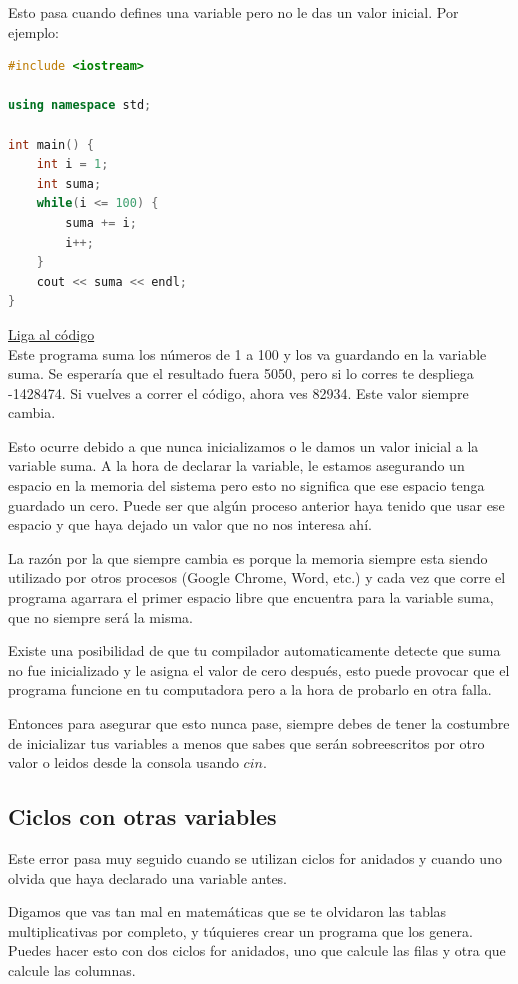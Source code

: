 \documentclass{article}
\begin{document}
Esto pasa cuando defines una variable pero no le das un valor inicial. Por ejemplo:

\begin{lstlisting}[language=C++, caption=Error de inicialización]
#include <iostream>

using namespace std;

int main() {
    int i = 1;
    int suma;
    while(i <= 100) {
        suma += i;
        i++;
    }
    cout << suma << endl;
}
\end{lstlisting}
\href{https://repl.it/@Jamesscn/Suma-Imposible}{Liga al código}\\

Este programa suma los números de 1 a 100 y los va guardando en la variable suma. Se esperaría que el resultado fuera 5050, pero si lo corres te despliega -1428474. Si vuelves a correr el código, ahora ves 82934. Este valor siempre cambia.

Esto ocurre debido a que nunca inicializamos o le damos un valor inicial a la variable suma. A la hora de declarar la variable, le estamos asegurando un espacio en la memoria del sistema pero esto no significa que ese espacio tenga guardado un cero. Puede ser que algún proceso anterior haya tenido que usar ese espacio y que haya dejado un valor que no nos interesa ahí.

La razón por la que siempre cambia es porque la memoria siempre esta siendo utilizado por otros procesos (Google Chrome, Word, etc.) y cada vez que corre el programa agarrara el primer espacio libre que encuentra para la variable suma, que no siempre será la misma.

Existe una posibilidad de que tu compilador automaticamente detecte que suma no fue inicializado y le asigna el valor de cero después, esto puede provocar que el programa funcione en tu computadora pero a la hora de probarlo en otra falla.

Entonces para asegurar que esto nunca pase, siempre debes de tener la costumbre de inicializar tus variables a menos que sabes que serán sobreescritos por otro valor o leidos desde la consola usando $cin$.

\subsection{Ciclos con otras variables}
Este error pasa muy seguido cuando se utilizan ciclos for anidados y cuando uno olvida que haya declarado una variable antes.

Digamos que vas tan mal en matemáticas que se te olvidaron las tablas multiplicativas por completo, y túquieres crear un programa que los genera. Puedes hacer esto con dos ciclos for anidados, uno que calcule las filas y otra que calcule las columnas.
\end{document}
